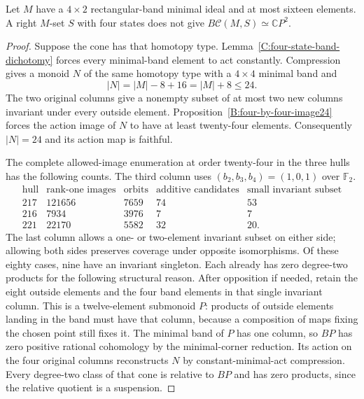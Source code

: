 \begin{proposition}
\label{C:four-state-four-row-cones21}
Let $M$ have a $4\times2$ rectangular-band minimal ideal and
at most sixteen elements.  A right $M$-set $S$ with four states
does not give $B\mathcal C(M,S)\simeq\mathbb CP^2$.
\end{proposition}
\begin{proof}
Suppose the cone has that homotopy type.
Lemma~\ref{C:four-state-band-dichotomy} forces every minimal-band
element to act constantly.  Compression gives a monoid $N$ of
the same homotopy type with a $4\times4$ minimal band and
\[
 |N|=|M|-8+16=|M|+8\leq24.
\]
The two original columns give a nonempty subset of at most two
new columns invariant under every outside element.
Proposition~\ref{B:four-by-four-image24} forces the action image
of $N$ to have at least twenty-four elements.  Consequently
$|N|=24$ and its action map is faithful.

The complete allowed-image enumeration at order twenty-four in
the three hulls has the following counts.  The third column
uses $(b_2,b_3,b_4)=(1,0,1)$ over $\mathbb F_2$.
\[
 \begin{array}{c|r|r|r|r}
 \text{hull}&\text{rank-one images}&\text{orbits}&
 \text{additive candidates}&\text{small invariant subset}\\\hline
 217&121656&7659&74&53\\
 216&7934&3976&7&7\\
 221&22170&5582&32&20.
 \end{array}
\]
The last column allows a one- or two-element invariant subset on
either side; allowing both sides preserves coverage under opposite
isomorphisms.  Of these eighty cases, nine have an invariant
singleton.  Each already has zero degree-two products for the
following structural reason.  After opposition if needed, retain
the eight outside elements and the four band elements in that
single invariant column.  This is a twelve-element submonoid
$P$: products of outside elements landing in the band must
have that column, because a composition of maps fixing the
chosen point still fixes it.  The minimal band of $P$ has one
column, so $BP$ has zero positive rational cohomology by the
minimal-corner reduction.  Its action on the four original
columns reconstructs $N$ by constant-minimal-act compression.
Every degree-two class of that cone is relative to $BP$ and
has zero products, since the relative quotient is a suspension.


\end{proof}
